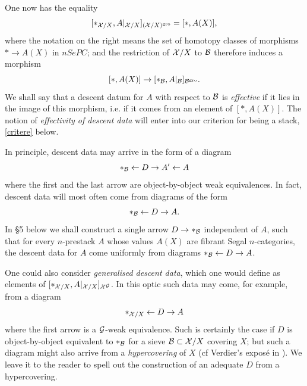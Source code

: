 One now has the equality
$$
[\ast _{{\cal X} /X},A|_{{\cal X} /X}]_{({\cal X} /X) ^{\rm gro}}
= [\ast , A(X)],
$$
where the notation on the right means the set of homotopy classes of
morphisms $\ast
\rightarrow A(X)$ in $nSePC$; and the restriction of ${\cal X} /X$ to ${\cal B}$
therefore induces a morphism
$$
[\ast , A(X)]\rightarrow
[\ast _{{\cal B}},A|_{{\cal B}}]_{{\cal B} ^{\rm gro}}.
$$
We shall say that a descent datum for $A$ with respect to ${\cal B}$
is {\em effective} if it lies in the image of this morphism, i.e. if it
comes from an element of $[\ast , A(X)]$.
The notion of {\em effectivity of descent data} will enter into our
criterion for being a stack, \ref{critere} below.

In principle, descent data may arrive in the form of a diagram
$$
\ast _{{\cal B}} \leftarrow D \rightarrow A'\leftarrow A
$$
where the first and the last arrow are object-by-object weak equivalences.
In fact, descent data will most often come from diagrams of the form
$$
\ast _{{\cal B}} \leftarrow D \rightarrow A.
$$
In \S 5 below we shall construct a single arrow $D\rightarrow \ast
_{{\cal B}}$ independent of $A$, such that for every $n$-prestack $A$ whose
values $A(X)$ are fibrant Segal $n$-categories, the descent data for
$A$ come uniformly from diagrams
$\ast _{{\cal B}} \leftarrow D \rightarrow
A$.

One could also consider {\em generalised descent
data}, which one would define as elements of
$[\ast _{{\cal X}
/X}, A|_{{\cal X} /X}]_{{\cal X} ^{{\cal G}}}$.
In this optic such data may come, for example, from a diagram
$$
\ast _{{\cal X} /X} \leftarrow D \rightarrow A
$$
where the first arrow is a ${\cal G}$-weak equivalence. Such is
certainly the case if $D$ is object-by-object equivalent to $\ast_{{\cal B}}$
for a sieve ${\cal B} \subset {\cal X} /X$ covering $X$; but such a diagram
might also arrive from a {\em hypercovering} of $X$
(cf Verdier's exposé in \cite{SGA4b}).
We leave it to the reader to spell out the construction of an adequate $D$
from a hypercovering.
